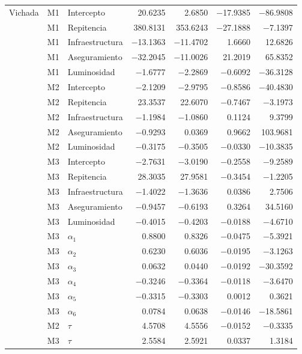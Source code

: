 \begin{longtable}{l c l r r r r}
\hline

Vichada & M1 & Intercepto & \num{20.6235} & \num{2.6850} & \num{-17.9385} & \num{-86.9808} \\
 & M1 & Repitencia & \num{380.8131} & \num{353.6243} & \num{-27.1888} & \num{-7.1397} \\
 & M1 & Infraestructura & \num{-13.1363} & \num{-11.4702} & \num{1.6660} & \num{12.6826} \\
 & M1 & Aseguramiento & \num{-32.2045} & \num{-11.0026} & \num{21.2019} & \num{65.8352} \\
 & M1 & Luminosidad & \num{-1.6777} & \num{-2.2869} & \num{-0.6092} & \num{-36.3128} \\
 & M2 & Intercepto & \num{-2.1209} & \num{-2.9795} & \num{-0.8586} & \num{-40.4830} \\
 & M2 & Repitencia & \num{23.3537} & \num{22.6070} & \num{-0.7467} & \num{-3.1973} \\
 & M2 & Infraestructura & \num{-1.1984} & \num{-1.0860} & \num{0.1124} & \num{9.3799} \\
 & M2 & Aseguramiento & \num{-0.9293} & \num{0.0369} & \num{0.9662} & \num{103.9681} \\
 & M2 & Luminosidad & \num{-0.3175} & \num{-0.3505} & \num{-0.0330} & \num{-10.3835} \\
 & M3 & Intercepto & \num{-2.7631} & \num{-3.0190} & \num{-0.2558} & \num{-9.2589} \\
 & M3 & Repitencia & \num{28.3035} & \num{27.9581} & \num{-0.3454} & \num{-1.2205} \\
 & M3 & Infraestructura & \num{-1.4022} & \num{-1.3636} & \num{0.0386} & \num{2.7506} \\
 & M3 & Aseguramiento & \num{-0.9457} & \num{-0.6193} & \num{0.3264} & \num{34.5160} \\
 & M3 & Luminosidad & \num{-0.4015} & \num{-0.4203} & \num{-0.0188} & \num{-4.6710} \\
 & M3 & $\alpha_{1}$ & \num{0.8800} & \num{0.8326} & \num{-0.0475} & \num{-5.3921} \\
 & M3 & $\alpha_{2}$ & \num{0.6230} & \num{0.6036} & \num{-0.0195} & \num{-3.1263} \\
 & M3 & $\alpha_{3}$ & \num{0.0632} & \num{0.0440} & \num{-0.0192} & \num{-30.3592} \\
 & M3 & $\alpha_{4}$ & \num{-0.3246} & \num{-0.3364} & \num{-0.0118} & \num{-3.6470} \\
 & M3 & $\alpha_{5}$ & \num{-0.3315} & \num{-0.3303} & \num{0.0012} & \num{0.3621} \\
 & M3 & $\alpha_{6}$ & \num{0.0784} & \num{0.0638} & \num{-0.0146} & \num{-18.5861} \\
 & M2 & $\tau$ & \num{4.5708} & \num{4.5556} & \num{-0.0152} & \num{-0.3335} \\
 & M3 & $\tau$ & \num{2.5584} & \num{2.5921} & \num{0.0337} & \num{1.3184} \\


\end{longtable}
